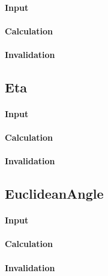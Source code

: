 \paragraph{Input}

\paragraph{Calculation}

\paragraph{Invalidation}

\bigskip

\subsection{Eta}

\paragraph{Input}

\paragraph{Calculation}

\paragraph{Invalidation}

\bigskip

\subsection{EuclideanAngle}

\paragraph{Input}

\paragraph{Calculation}

\paragraph{Invalidation}

\bigskip


